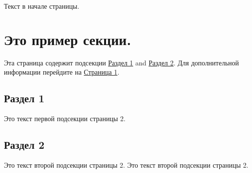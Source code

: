Текст в начале страницы. \hypertarget{page3_sec}{}\section{Это пример секции.}\label{page3_sec}
Эта страница содержит подсекции \hyperlink{page2_p02subsec01}{Раздел 1} and \hyperlink{page2_p02subsec02}{Раздел 2}. Для дополнительной информации перейдите на \hyperlink{page2}{Страница 1}. \hypertarget{page2_p02subsec01}{}\subsection{Раздел 1}\label{page2_p02subsec01}
Это текст первой подсекции страницы 2. \hypertarget{page2_p02subsec02}{}\subsection{Раздел 2}\label{page2_p02subsec02}
Это текст второй подсекции страницы 2. Это текст второй подсекции страницы 2. 